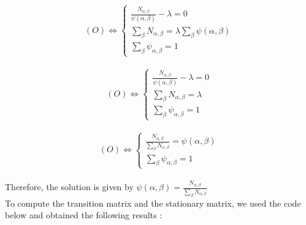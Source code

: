 \documentclass[12pt,a4paper]{report} %
\begin{document}
\[ (O) \Leftrightarrow
 \left\{
\begin{array}{l}
\text{$\frac{N_{\alpha, \beta}}{\psi(\alpha,\beta)} - \lambda=0$} \\
\text{$\underset{\beta}\sum N_{\alpha, \beta} = \lambda \underset{\beta}\sum\psi(\alpha, \beta)$} \\
\text{$\underset{{\beta}}\sum \psi_{\alpha, \beta} = 1$}
\end{array}
\right.
\] \\

\[ (O) \Leftrightarrow
 \left\{
\begin{array}{l}
\text{$\frac{N_{\alpha, \beta}}{\psi(\alpha,\beta)} - \lambda=0$} \\
\text{$\underset{\beta}\sum N_{\alpha, \beta} = \lambda$} \\
\text{$\underset{{\beta}}\sum \psi_{\alpha, \beta} = 1$}
\end{array}
\right.
\] \\

\[ (O) \Leftrightarrow
 \left\{
\begin{array}{l}
\text{$\frac{N_{\alpha, \beta}}{\underset{\beta}\sum N_{\alpha, \beta}} = \psi(\alpha,\beta)$} \\
\text{$\underset{{\beta}}\sum \psi_{\alpha, \beta} = 1$}
\end{array}
\right.
\] \\

Therefore, the solution is given by $\psi(\alpha,\beta)=\frac{N_{\alpha, \beta}}{\underset{\beta}\sum N_{\alpha, \beta}} $ \\

To compute the transition matrix and the stationary matrix, we used the code below and obtained the  following results : 
\end{document}
